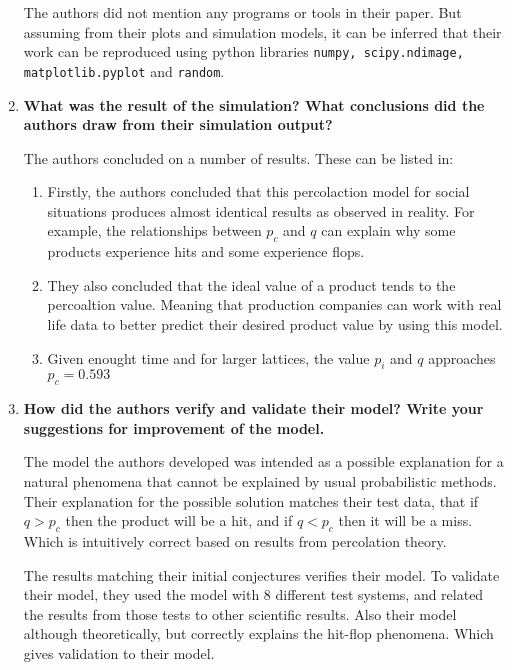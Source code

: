 \documentclass[article, 11pt, a4paper, oneside]{memoir}
\begin{document}
\begin{enumerate}[left=0pt, itemsep=20pt, label={\(\square\)}]
        The authors did not mention any programs or tools in their paper. But assuming
        from their plots and simulation models, it can be inferred that their work can be
        reproduced using python libraries \texttt{numpy, scipy.ndimage, matplotlib.pyplot}
        and \texttt{random}.


    \item \textbf{What was the result of the simulation? What conclusions did the authors
        draw from their simulation output?}

        The authors concluded on a number of results. These can be listed in:
        \begin{enumerate}[left=0pt, itemsep=0pt]
            \item Firstly, the authors concluded that this percolaction model for social
                situations produces almost identical results as observed in reality. For
                example, the relationships between \(p_c\) and \(q\) can explain why some
                products experience hits and some experience flops.
            \item They also concluded that the ideal value of a product tends to the
                percoaltion value. Meaning that production companies can work with real
                life data to better predict their desired product value by using this
                model.
            \item Given enought time and for larger lattices, the value \(p_i\) and \(q\)
                approaches \(p_c=0.593\)
        \end{enumerate}


    \item \textbf{How did the authors verify and validate their model? Write your
        suggestions for improvement of the model.}

        The model the authors developed was intended as a possible explanation for a
        natural phenomena that cannot be explained by usual probabilistic methods. Their
        explanation for the possible solution matches their test data, that if \(q > p_c\)
        then the product will be a hit, and if \(q < p_c\) then it will be a miss. Which
        is intuitively correct based on results from percolation theory. 

        The results matching their initial conjectures verifies their model. To validate
        their model, they used the model with 8 different test systems, and related the
        results from those tests to other scientific results. Also their model
        although theoretically, but correctly explains the hit-flop phenomena. Which gives
        validation to their model.



\end{enumerate}
\end{document}
